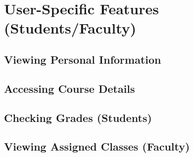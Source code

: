 \newpage
\section{User-Specific Features (Students/Faculty)}

\subsection{Viewing Personal Information}

\subsection{Accessing Course Details}

\subsection{Checking Grades (Students)}

\subsection{Viewing Assigned Classes (Faculty)}

